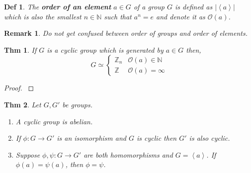 \documentclass[paper=a4, fontsize=11pt]{scrartcl}
\newcommand{\Zn}[1]{\mathbb{Z}_{#1}}
\newcommand{\cyc}[1]{\left< #1 \right>}
\newcommand{\nextline}{$ $ \newline \vspace{-0.15in}}
\newtheorem{theorem}{Thm}
\newtheorem{definition}{Def}
\newtheorem*{remark}{Remark}
\begin{document}
\begin{definition}
	The \textbf{order of an element} $a\in G$ of a group $G$ is defined as $|\cyc{a}|$ which is also the smallest $n\in \mathbb{N}$ such that $a^n=e$ and denote it as $\mathcal{O}(a)$.\\
\end{definition}

\begin{remark}
	Do not get confused between order of groups and order of elements.\\
\end{remark}

\begin{theorem}
	If $G$ is a cyclic group which is generated by $a \in G$ then,
	\begin{equation}\nonumber
		G \simeq 
		\begin{cases}
		\Zn{n} & \mathcal{O}(a)\in\mathbb{N} \\ 
		\mathbb{Z} & \mathcal{O}(a) = \infty
		\end{cases}
	\end{equation}
\end{theorem}

\begin{proof}
\nextline
{}
\end{proof}

\begin{theorem}
	Let $G,G'$ be groups.
	\begin{enumerate}
		\item A cyclic group is abelian.
		\item If $\phi:G\to G'$ is an isomorphism and $G$ is cyclic then $G'$ is also cyclic.
		\item Suppose $\phi,\psi:G\to G'$ are both homomorphisms and $G=\cyc{a}$. If $\phi(a)=\psi(a)$, then $\phi=\psi$.\\
	\end{enumerate}
\end{theorem}
\end{document}

